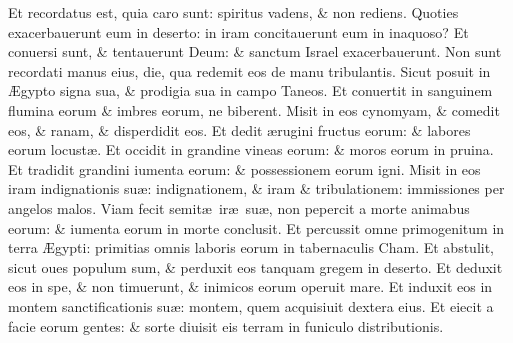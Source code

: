 \documentclass[a5paper,10pt]{book}
\def\ae{æ}
\def\AE{Æ}
\begin{document}
\begin{multicols*}{2}
\newline \color{red} E\color{black}t recordatus est, quia caro sunt: spiritus vadens, \& non rediens.
\newline \color{red} Q\color{black}uoties exacerbauerunt eum in deserto: in iram concitauerunt eum in inaquoso?
\newline \color{red} E\color{black}t conuersi sunt, \& tentauerunt Deum: \& sanctum Israel exacerbauerunt.
\newline \color{red} N\color{black}on sunt recordati manus eius, die, qua redemit eos de manu tribulantis.
\newline \color{red} S\color{black}icut posuit in \AE gypto signa sua, \& prodigia sua in campo Taneos.
\newline \color{red} E\color{black}t conuertit in sanguinem flumina eorum \& imbres eorum, ne biberent.
\newline \color{red} M\color{black}isit in eos cynomyam, \& comedit eos, \& ranam, \& disperdidit eos.
\newline \color{red} E\color{black}t dedit \ae rugini fructus eorum: \& labores eorum locust\ae .
\newline \color{red} E\color{black}t occidit in grandine vineas eorum: \& moros eorum in pruina.
\newline \color{red} E\color{black}t tradidit grandini iumenta eorum: \& possessionem eorum igni.
\newline \color{red} M\color{black}isit in eos iram indignationis su\ae : indignationem, \& iram \& tribulationem: immissiones per angelos malos.
\newline \color{red} V\color{black}iam fecit semit\ae \ ir\ae \ su\ae , non pepercit a morte animabus eorum: \& iumenta eorum in morte conclusit.
\newline \color{red} E\color{black}t percussit omne primogenitum in terra \AE gypti: primitias omnis laboris eorum in tabernaculis Cham.
\newline \color{red} E\color{black}t abstulit, sicut oues populum sum, \& perduxit eos tanquam gregem in deserto.%
\newline \color{red} E\color{black}t deduxit eos in spe, \& non timuerunt, \& inimicos eorum operuit mare.
\newline \color{red} E\color{black}t induxit eos in montem sanctificationis su\ae : montem, quem acquisiuit dextera eius.
\newline \color{red} E\color{black}t eiecit a facie eorum gentes: \& sorte diuisit eis terram in funiculo distributionis.

\end{multicols*}
\end{document}
